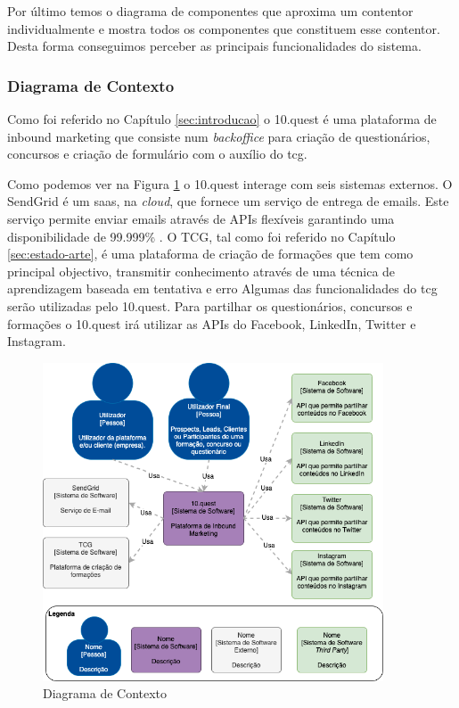Por último temos o diagrama de componentes que aproxima um contentor individualmente e mostra todos os componentes que constituem esse contentor. Desta forma conseguimos perceber as principais funcionalidades do sistema. 


\subsubsection{Diagrama de Contexto}

Como foi referido no Capítulo \ref{sec:introducao} o 10.quest é uma plataforma de inbound marketing que consiste num \textit{backoffice} para criação de questionários, concursos e criação de formulário com o auxílio do \acrshort{tcg}.

Como podemos ver na Figura \ref{fig:arq-contexto} o 10.quest interage com seis sistemas externos. O SendGrid\cite{sg} é um \acrshort{saas}, na \textit{cloud}, que fornece um serviço de entrega de emails. Este serviço permite enviar emails através de APIs flexíveis garantindo uma disponibilidade  de 99.999\% \cite{sguptime}. 
O TCG, tal como foi referido no Capítulo \ref{sec:estado-arte}, é uma plataforma de criação de formações que tem como principal objectivo, transmitir conhecimento através de uma técnica de aprendizagem baseada em tentativa e erro Algumas das funcionalidades do \acrshort{tcg} serão utilizadas pelo 10.quest.
Para partilhar os questionários, concursos e formações o 10.quest irá utilizar as APIs do Facebook, LinkedIn, Twitter e Instagram.


\newpage

\begin{figure}[ht!]
	\begin{center}
		\includegraphics[width=0.9\textwidth]{img/arq/diagrama-contexto}
		\caption{Diagrama de Contexto}
		\label{fig:arq-contexto}
	\end{center}
\end{figure}

